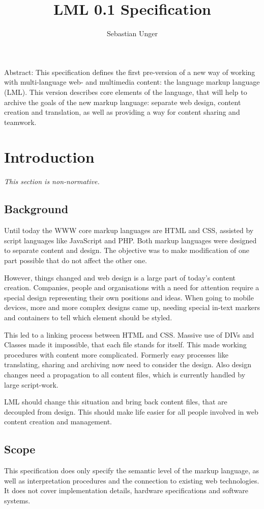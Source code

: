 \documentclass[12pt,a4paper]{article}
\author{Sebastian Unger}
\title{LML 0.1 Specification}
\begin{document}
\maketitle
Abstract: This specification defines the first pre-version of a new way of working with multi-language web- and multimedia content: the language markup language (LML). This version describes core elements of the language, that will help to archive the goals of the new markup language: separate web design, content creation and translation, as well as providing a way for content sharing and teamwork.
\tableofcontents
\newpage

\section{Introduction}
\begin{small}\textit{This section is non-normative.}\end{small}

\subsection{Background}
Until today the WWW core markup languages are HTML and CSS, assisted by script languages like JavaScript and PHP. Both markup languages were designed to separate content and design. The objective was to make modification of one part possible that do not affect the other one.

However, things changed and web design is a large part of today's content creation. Companies, people and organisations with a need for attention require a special design representing their own positions and ideas. When going to mobile devices, more and more complex designs came up, needing special in-text markers and containers to tell which element should be styled.

This led to a linking process between HTML and CSS. Massive use of DIVs and Classes made it impossible, that each file stands for itself. This made working procedures with content more complicated. Formerly easy processes like translating, sharing and archiving now need to consider the design. Also design changes need a propagation to all content files, which is currently handled by large script-work.

LML should change this situation and bring back content files, that are decoupled from design. This should make life easier for all people involved in web content creation and management.

\subsection{Scope}
This specification does only specify the semantic level of the markup language, as well as interpretation procedures and the connection to existing web technologies. It does not cover implementation details, hardware specifications and software systems.
\end{document}
